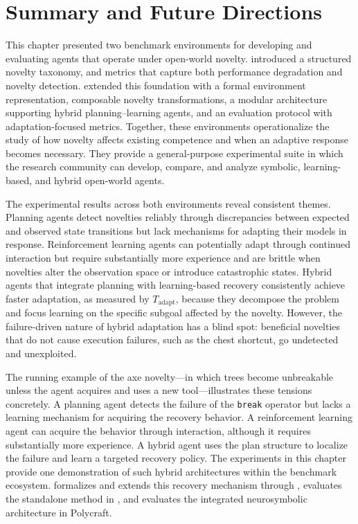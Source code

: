 \section{Summary and Future Directions}
\label{sec:benchmarks_summary}

This chapter presented two benchmark environments for developing and evaluating agents that operate under open-world novelty. \NovelGridworlds{} introduced a structured novelty taxonomy,
and metrics that capture both performance degradation and novelty detection. \NovelGym{} extended this foundation with a formal environment representation, composable novelty transformations, a modular architecture supporting hybrid planning--learning agents, and an evaluation protocol with adaptation-focused metrics. Together, these environments operationalize the study of how novelty affects existing competence and when an adaptive response becomes necessary. They provide a general-purpose experimental suite in which the research community can develop, compare, and analyze symbolic, learning-based, and hybrid open-world agents.

The experimental results across both environments reveal consistent themes. Planning agents detect novelties reliably through discrepancies between expected and observed state transitions but lack mechanisms for adapting their models in response. Reinforcement learning agents can potentially adapt through continued interaction but require substantially more experience and are brittle when novelties alter the observation space or introduce catastrophic states. Hybrid agents that integrate planning with learning-based recovery consistently achieve faster adaptation, as measured by $T_\text{adapt}$, because they decompose the problem and focus learning on the specific subgoal affected by the novelty. However, the failure-driven nature of hybrid adaptation has a blind spot: beneficial novelties that do not cause execution failures, such as the chest shortcut, go undetected and unexploited.

The running example of the axe novelty---in which trees become unbreakable unless the agent acquires and uses a new tool---illustrates these tensions concretely. A planning agent detects the failure of the {\tt break} operator but lacks a learning mechanism for acquiring the recovery behavior. A reinforcement learning agent can acquire the behavior through interaction, although it requires substantially more experience. A hybrid agent uses the plan structure to localize the failure and learn a targeted recovery policy. The \NovelGym{} experiments in this chapter provide one demonstration of such hybrid architectures within the benchmark ecosystem.  formalizes and extends this recovery mechanism through \RAPidLearn{}, evaluates the standalone method in \NovelGridworlds{}, and evaluates the integrated neurosymbolic architecture in Polycraft.

